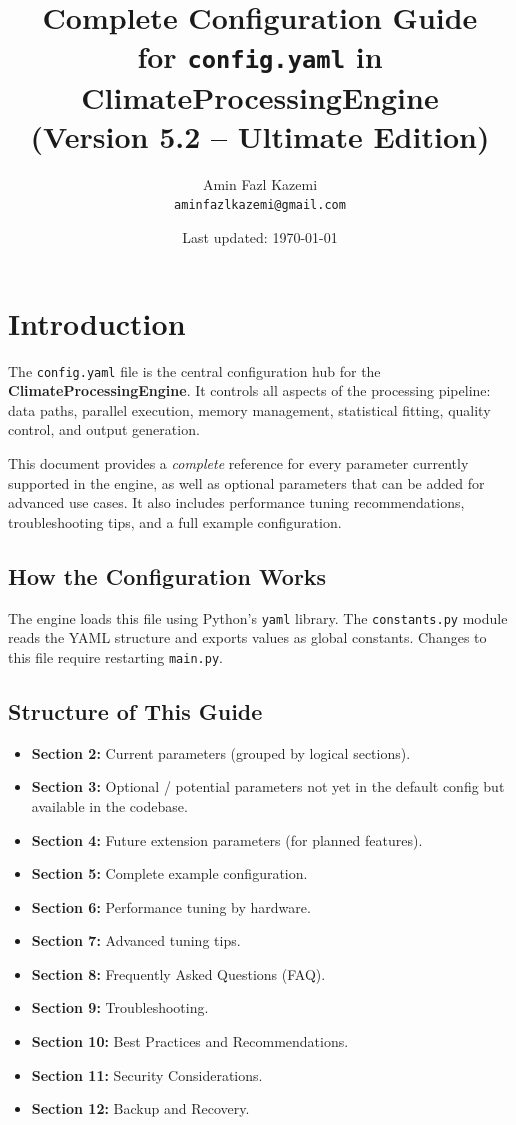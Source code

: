 \documentclass[12pt,a4paper]{article}
\title{
    \vspace{1.5cm}
    \Huge\textbf{Complete Configuration Guide} \\
    \Large for \texttt{config.yaml} in ClimateProcessingEngine \\
    \vspace{0.3cm}
    \large (Version 5.2 – Ultimate Edition)
    \vspace{0.5cm}
}
\author{Amin Fazl Kazemi \\ \texttt{aminfazlkazemi@gmail.com}}
\date{Last updated: \today}
\begin{document}
\maketitle
\tableofcontents
\newpage

\section{Introduction}

The \texttt{config.yaml} file is the central configuration hub for the \textbf{ClimateProcessingEngine}. It controls all aspects of the processing pipeline: data paths, parallel execution, memory management, statistical fitting, quality control, and output generation.

This document provides a \emph{complete} reference for every parameter currently supported in the engine, as well as optional parameters that can be added for advanced use cases. It also includes performance tuning recommendations, troubleshooting tips, and a full example configuration.

\subsection{How the Configuration Works}
The engine loads this file using Python's \texttt{yaml} library. The \texttt{constants.py} module reads the YAML structure and exports values as global constants. Changes to this file require restarting \texttt{main.py}.

\subsection{Structure of This Guide}
\begin{itemize}
    \item \textbf{Section 2:} Current parameters (grouped by logical sections).
    \item \textbf{Section 3:} Optional / potential parameters not yet in the default config but available in the codebase.
    \item \textbf{Section 4:} Future extension parameters (for planned features).
    \item \textbf{Section 5:} Complete example configuration.
    \item \textbf{Section 6:} Performance tuning by hardware.
    \item \textbf{Section 7:} Advanced tuning tips.
    \item \textbf{Section 8:} Frequently Asked Questions (FAQ).
    \item \textbf{Section 9:} Troubleshooting.
    \item \textbf{Section 10:} Best Practices and Recommendations.
    \item \textbf{Section 11:} Security Considerations.
    \item \textbf{Section 12:} Backup and Recovery.
\end{itemize}
\end{document}
